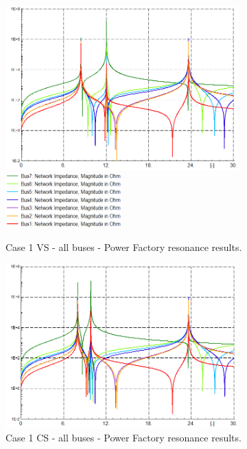\documentclass[12pt]{report} %
\begin{document}
\begin{figure}[htb]
	\centering
	\includegraphics[width=0.8\textwidth]{img/Case1/PF_impAll_VS.PNG}
	\includegraphics[width=0.4\textwidth]{img/Case1/PF_impAllLegend.PNG}
	\caption{Case 1 VS - all buses - Power Factory resonance results.}
  	\label{fig:c1pfvs2}
\end{figure}
\FloatBarrier

\begin{figure}[htb]
	\centering
	\includegraphics[width=0.8\textwidth]{img/Case1/PF_impAll_CS.PNG}
	\caption{Case 1 CS - all buses - Power Factory resonance results.}
  	\label{fig:c1pfcs2}
\end{figure}
\FloatBarrier
\end{document}
